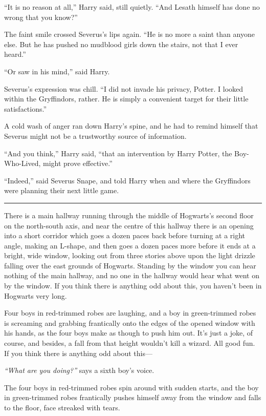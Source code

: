 ``It is no reason at all,'' Harry said, still quietly. ``And Lesath
himself has done no wrong that you know?''

The faint smile crossed Severus's lips again. ``He is no more a saint
than anyone else. But he has pushed no mudblood girls down the stairs,
not that I ever heard.''

``Or saw in his mind,'' said Harry.

Severus's expression was chill. ``I did not invade his privacy, Potter.
I looked within the Gryffindors, rather. He is simply a convenient
target for their little satisfactions.''

A cold wash of anger ran down Harry's spine, and he had to remind
himself that Severus might not be a trustworthy source of information.

``And you think,'' Harry said, ``that an intervention by Harry Potter,
the Boy-Who-Lived, might prove effective.''

``Indeed,'' said Severus Snape, and told Harry when and where the
Gryffindors were planning their next little game.

\begin{center}\rule{3in}{0.4pt}\end{center}

There is a main hallway running through the middle of Hogwarts's second
floor on the north-south axis, and near the centre of this hallway there
is an opening into a short corridor which goes a dozen paces back before
turning at a right angle, making an L-shape, and then goes a dozen paces
more before it ends at a bright, wide window, looking out from three
stories above upon the light drizzle falling over the east grounds of
Hogwarts. Standing by the window you can hear nothing of the main
hallway, and no one in the hallway would hear what went on by the
window. If you think there is anything odd about this, you haven't been
in Hogwarts very long.

Four boys in red-trimmed robes are laughing, and a boy in green-trimmed
robes is screaming and grabbing frantically onto the edges of the opened
window with his hands, as the four boys make as though to push him out.
It's just a joke, of course, and besides, a fall from that height
wouldn't kill a wizard. All good fun. If you think there is anything odd
about this---

\emph{``What are you doing?''} says a sixth boy's voice.

The four boys in red-trimmed robes spin around with sudden starts, and
the boy in green-trimmed robes frantically pushes himself away from the
window and falls to the floor, face streaked with tears.

